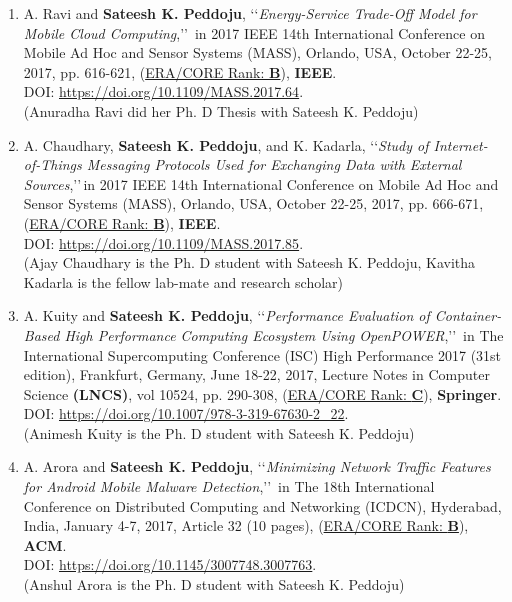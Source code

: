 \begin{enumerate}
	
	\item
	A. Ravi and \textbf{Sateesh K. Peddoju}, \lq\lq \textit{Energy-Service Trade-Off Model for Mobile Cloud Computing},\rq\rq\, in 2017 IEEE 14th International Conference on Mobile Ad Hoc and Sensor Systems (MASS), Orlando, USA, October 22-25, 2017, pp. 616-621, (\underline{ERA/CORE Rank: \textbf{B}}), \textbf{IEEE}. \\DOI: \url{https://doi.org/10.1109/MASS.2017.64}. \\(Anuradha Ravi did her Ph. D Thesis with Sateesh K. Peddoju)

	
		\item
	A. Chaudhary, \textbf{Sateesh K. Peddoju}, and K. Kadarla, \lq\lq \textit{Study of Internet-of-Things Messaging Protocols Used for Exchanging Data with External Sources},\rq\rq\,in 2017 IEEE 14th International Conference on Mobile Ad Hoc and Sensor Systems (MASS), Orlando, USA, October 22-25, 2017, pp. 666-671, (\underline{ERA/CORE Rank: \textbf{B}}), \textbf{IEEE}. \\DOI: \url{https://doi.org/10.1109/MASS.2017.85}. \\(Ajay Chaudhary is the Ph. D student with Sateesh K. Peddoju, Kavitha Kadarla is the fellow lab-mate and research scholar)

	
	\item
	A. Kuity and \textbf{Sateesh K. Peddoju}, \lq\lq \textit{Performance Evaluation of Container-Based High Performance Computing Ecosystem Using OpenPOWER},\rq\rq\, in The International Supercomputing Conference (ISC) High Performance 2017 (31st edition), Frankfurt, Germany, June 18-22, 2017, Lecture Notes in Computer Science \textbf{(LNCS)}, vol 10524, pp. 290-308,  (\underline{ERA/CORE Rank: \textbf{C}}), \textbf{Springer}. \\DOI: \url{https://doi.org/10.1007/978-3-319-67630-2_22}. \\(Animesh Kuity is the Ph. D student with Sateesh K. Peddoju)

	
	\item
	A. Arora and \textbf{Sateesh K. Peddoju}, \lq\lq \textit{Minimizing Network Traffic Features for Android Mobile Malware Detection},\rq\rq\, in The 18th International Conference on Distributed Computing and Networking (ICDCN), Hyderabad, India, January 4-7, 2017, Article 32 (10 pages), (\underline{ERA/CORE Rank: \textbf{B}}), \textbf{ACM}.  \\DOI: \url{https://doi.org/10.1145/3007748.3007763}. \\ (Anshul Arora is the Ph. D student with Sateesh K. Peddoju)


\end{enumerate}
